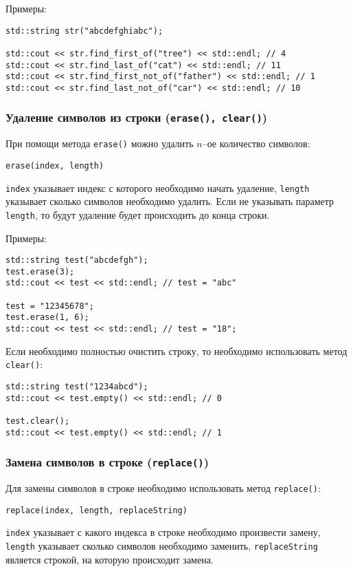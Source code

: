 Примеры:
\begin{lstlisting}
std::string str("abcdefghiabc");

std::cout << str.find_first_of("tree") << std::endl; // 4
std::cout << str.find_last_of("cat") << std::endl; // 11
std::cout << str.find_first_not_of("father") << std::endl; // 1
std::cout << str.find_last_not_of("car") << std::endl; // 10
\end{lstlisting}

\subsubsection{Удаление символов из строки (\texttt{erase(), clear()})}

При помощи метода \lstinline|erase()| можно удалить $n$--ое количество символов:

\lstinline|erase(index, length)|

\lstinline|index| указывает индекс с которого необходимо начать удаление, \lstinline|length| указывает сколько символов необходимо удалить. Если не указывать параметр \lstinline|length|, то будут удаление будет происходить до конца строки.

Примеры:
\begin{lstlisting}
std::string test("abcdefgh");
test.erase(3);
std::cout << test << std::endl; // test = "abc"

test = "12345678";
test.erase(1, 6);
std::cout << test << std::endl; // test = "18";
\end{lstlisting}

Если необходимо полностью очистить строку, то необходимо использовать метод \lstinline|clear()|:
\begin{lstlisting}
std::string test("1234abcd");
std::cout << test.empty() << std::endl; // 0

test.clear();
std::cout << test.empty() << std::endl; // 1
\end{lstlisting}

\subsubsection{Замена символов в строке (\texttt{replace()})}

Для замены символов в строке необходимо использовать метод \lstinline|replace()|:

\lstinline|replace(index, length, replaceString)|

\lstinline|index| указывает с какого индекса в строке необходимо произвести замену, \lstinline|length| указывает сколько символов необходимо заменить, \lstinline|replaceString| является строкой, на которую происходит замена.

